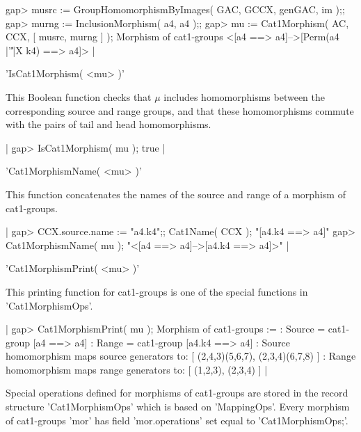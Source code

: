     gap> musrc := GroupHomomorphismByImages( GAC, GCCX, genGAC, im );;
    gap> murng := InclusionMorphism( a4, a4 );;
    gap> mu := Cat1Morphism( AC, CCX, [ musrc, murng ] );
    Morphism of cat1-groups <[a4 ==> a4]-->[Perm(a4 |'\|'|X k4) ==> a4]>   |

%

'IsCat1Morphism( <mu> )'

This Boolean function checks that $\mu$ includes homomorphisms between
the corresponding   source  and    range   groups, and    that   these
homomorphisms commute with the pairs of tail and head homomorphisms.

|    gap> IsCat1Morphism( mu );
    true |
    
%

'Cat1MorphismName( <mu> )'

This function  concatenates the  names of the   source and range  of a
morphism of cat1-groups.

|    gap> CCX.source.name := "a4.k4";; Cat1Name( CCX );
    "[a4.k4 ==> a4]"
    gap> Cat1MorphismName( mu );
    "<[a4 ==> a4]-->[a4.k4 ==> a4]>"  |
    
%

'Cat1MorphismPrint( <mu> )'

This printing function for cat1-groups is one of the special functions
in 'Cat1MorphismOps'.

|    gap> Cat1MorphismPrint( mu );
    Morphism of cat1-groups := 
    : Source = cat1-group [a4 ==> a4] 
    :  Range = cat1-group [a4.k4 ==> a4] 
    : Source homomorphism maps source generators to:
      [ (2,4,3)(5,6,7), (2,3,4)(6,7,8) ]
    : Range homomorphism maps range generators to:
      [ (1,2,3), (2,3,4) ]  |
   
%

Special operations defined for morphisms of  cat1-groups are stored in
the record structure 'Cat1MorphismOps' which is based on 'MappingOps'.
Every morphism of   cat1-groups 'mor' has  field  'mor.operations' set
equal to 'Cat1MorphismOps;'.

